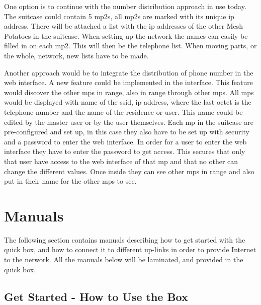 One option is to continue with the number distribution approach in use today. The suitcase could contain 5 \glspl{mp2}, all \glspl{mp2} are marked with its unique \gls{ip} address. There will be attached a list with the \gls{ip} addresses of the other Mesh Potatoes in the suitcase. When setting up the network the names can easily be filled in on each \gls{mp2}. This will then be the telephone list. When moving parts, or the whole, network, new lists have to be made. 

Another approach would be to integrate the distribution of phone number in the web interface. A new feature could be implemented in the interface. This feature would discover the other \glspl{mp} in range, also in range through other \glspl{mp}. All \glspl{mp} would be displayed with name of the \gls{ssid}, \gls{ip} address, where the last octet is the telephone number and the name of the residence or user. This name could be edited by the master user or by the user themselves. Each \gls{mp} in the suitcase are pre-configured and set up, in this case they also have to be set up with security and a password to enter the web interface. In order for a user to enter the web interface they have to enter the password to get access. This secures that only that user have access to the web interface of that \gls{mp} and that no other can change the different values. Once inside they can see other \glspl{mp} in range and also put in their name for the other \glspl{mp} to see. 



\section{Manuals}
The following section contains manuals describing how to get started with the \gls{quick} box, and how to connect it to different up-links in order to provide Internet to the network. All the manuals below will be laminated, and provided in the \gls{quick} box. 
\clearpage
\subsection{Get Started - How to Use the Box}

\clearpage
